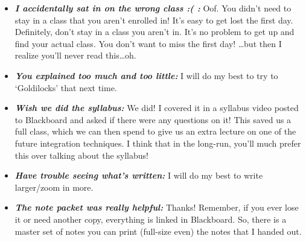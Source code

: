 \documentclass[11pt,letterpaper]{article}
\begin{document}
\begin{itemize}
\item {\bfseries\itshape I accidentally sat in on the wrong class :( :} Oof. You didn't need to stay in a class that you aren't enrolled in! It's easy to get lost the first day. Definitely, don't stay in a class you aren't in. It's no problem to get up and find your actual class. You don't want to miss the first day! \dots but then I realize you'll never read this\dots oh.

\item {\bfseries\itshape You explained too much and too little:} I will do my best to try to `Goldilocks' that next time. 

\item {\bfseries\itshape Wish we did the syllabus:} We did! I covered it in a syllabus video posted to Blackboard and asked if there were any questions on it! This saved us a full class, which we can then spend to give us an extra lecture on one of the future integration techniques. I think that in the long-run, you'll much prefer this over talking about the syllabus! 

\item {\bfseries\itshape Have trouble seeing what's written:} I will do my best to write larger/zoom in more.

\item {\bfseries\itshape The note packet was really helpful:} Thanks! Remember, if you ever lose it or need another copy, everything is linked in Blackboard. So, there is a master set of notes you can print (full-size even) the notes that I handed out. 
\end{itemize}
\end{document}

